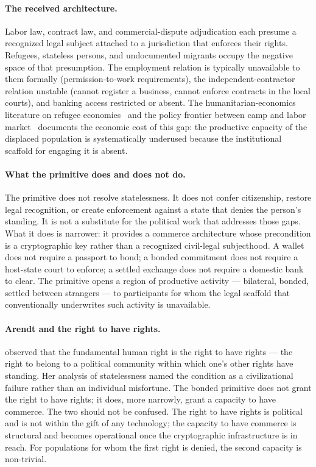 \documentclass[11pt,a4paper]{article}
\theoremstyle{remark}
\begin{document}
\paragraph{The received architecture.}
Labor law, contract law, and commercial-dispute adjudication each
presume a recognized legal subject attached to a jurisdiction that
enforces their rights. Refugees, stateless persons, and
undocumented migrants occupy the negative space of that
presumption. The employment relation is typically unavailable to
them formally (permission-to-work requirements), the
independent-contractor relation unstable (cannot register a
business, cannot enforce contracts in the local courts), and
banking access restricted or absent. The humanitarian-economics
literature on refugee economies~\citep{betts_collier_2017} and the
policy frontier between camp and labor
market~\citep{pritchett2006people} documents the economic cost of
this gap: the productive capacity of the displaced population is
systematically underused because the institutional scaffold for
engaging it is absent.

\paragraph{What the primitive does and does not do.}
The primitive does not resolve statelessness. It does not confer
citizenship, restore legal recognition, or create enforcement
against a state that denies the person's standing. It is not a
substitute for the political work that addresses those gaps.
What it does is narrower: it provides a commerce architecture
whose precondition is a cryptographic key rather than a recognized
civil-legal subjecthood. A wallet does not require a passport to
bond; a bonded commitment does not require a host-state court to
enforce; a settled exchange does not require a domestic bank to
clear. The primitive opens a region of productive activity ---
bilateral, bonded, settled between strangers --- to participants
for whom the legal scaffold that conventionally underwrites such
activity is unavailable.

\paragraph{Arendt and the right to have rights.}
\citet{arendt1951origins} observed that the fundamental human
right is the right to have rights --- the right to belong to a
political community within which one's other rights have
standing. Her analysis of statelessness named the condition as a
civilizational failure rather than an individual misfortune. The
bonded primitive does not grant the right to have rights; it does,
more narrowly, grant a capacity to have commerce. The two should
not be confused. The right to have rights is political and is not
within the gift of any technology; the capacity to have commerce
is structural and becomes operational once the cryptographic
infrastructure is in reach. For populations for whom the first
right is denied, the second capacity is non-trivial.
\end{document}
